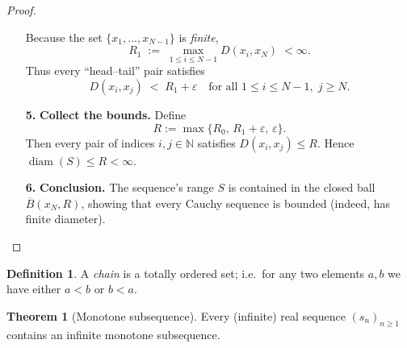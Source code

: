 \documentclass[12pt]{article}
\theoremstyle{definition} %
\newtheorem{theorem}{Theorem}
\newtheorem{definition}{Definition}
\theoremstyle{plain} %
\begin{document}
\begin{proof}
\begin{enumerate}
            \medskip
            Because the set \(\{x_1,\dots,x_{N-1}\}\) is \emph{finite},
            \[
            R_1\;:=\;\max_{1\le i\le N-1} D(x_i,x_N)\;<\infty .
            \]
            Thus every “head–tail” pair satisfies
            \[
            D(x_i,x_j)\;<\;R_1+\varepsilon
            \quad\text{for all }1\le i\le N-1,\; j\ge N.
            \]
      \item[\textbf{5.}] \textbf{Collect the bounds.}  
            Define
            \[
                R:=\max\{R_0,\,R_1+\varepsilon,\,\varepsilon\}.
            \]
            Then every pair of indices $i,j\in\mathbb N$ satisfies
            $D(x_i,x_j)\le R$.  Hence $\operatorname{diam}(S)\le R<\infty$.

      \item[\textbf{6.}] \textbf{Conclusion.}  
            The sequence’s range $S$ is contained in the closed ball
            $\overline{B}(x_N,R)$, showing that every Cauchy sequence is
            bounded (indeed, has finite diameter).
            \qedhere
  \end{enumerate}
\end{proof}
\begin{definition}
  A \emph{chain} is a totally ordered set; i.e.\ for any two elements
  $a,b$ we have either $a<b$ or $b<a$.
\end{definition}
\begin{theorem}[Monotone subsequence]\label{thm:monotone}
  Every (infinite) real sequence $(s_n)_{n\ge1}$ contains an infinite monotone
  subsequence.
  \end{theorem}
  
\end{document}

